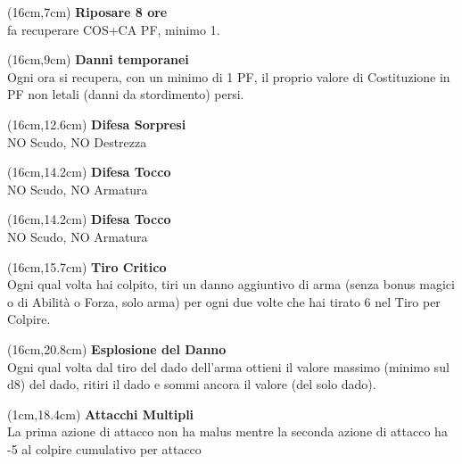 \documentclass[a4paper,12 pt,openany]{book}
\begin{document}
	\begin{textblock*}{4cm}(16cm,7cm) %
\textbf{Riposare 8 ore} \\fa recuperare COS+CA PF, minimo 1.
		\end{textblock*}
	
	
		\begin{textblock*}{4cm}(16cm,9cm) %
\textbf{Danni temporanei}\\ Ogni ora si recupera, con un minimo di 1 PF, il proprio valore di Costituzione in PF non letali (danni da stordimento) persi.
	\end{textblock*}


\begin{textblock*}{4cm}(16cm,12.6cm) %
\textbf{Difesa Sorpresi}\\NO Scudo, NO Destrezza
\end{textblock*}

\begin{textblock*}{4cm}(16cm,14.2cm) %
\textbf{Difesa Tocco}\\ NO Scudo, NO Armatura
\end{textblock*}



\begin{textblock*}{4cm}(16cm,14.2cm) %
	\textbf{Difesa Tocco}\\ NO Scudo, NO Armatura
\end{textblock*}


\begin{textblock*}{4cm}(16cm,15.7cm) %
\textbf{Tiro Critico}\\
Ogni qual volta hai colpito, tiri un danno aggiuntivo di arma (senza bonus magici o di Abilità o Forza, solo
arma) per ogni due volte che hai tirato 6 nel Tiro per Colpire.
\end{textblock*}

\begin{textblock*}{4cm}(16cm,20.8cm) %
\textbf{Esplosione del Danno}\\
Ogni qual volta dal tiro del dado dell’arma ottieni il valore massimo (minimo sul d8) del dado, ritiri il dado e sommi ancora il valore (del solo dado).
\end{textblock*}


\begin{textblock*}{4cm}(1cm,18.4cm) %
	\textbf{Attacchi Multipli}\\
La prima azione di attacco non ha malus mentre la seconda azione di attacco ha -5 al colpire cumulativo per attacco
\end{textblock*}
\end{document}
